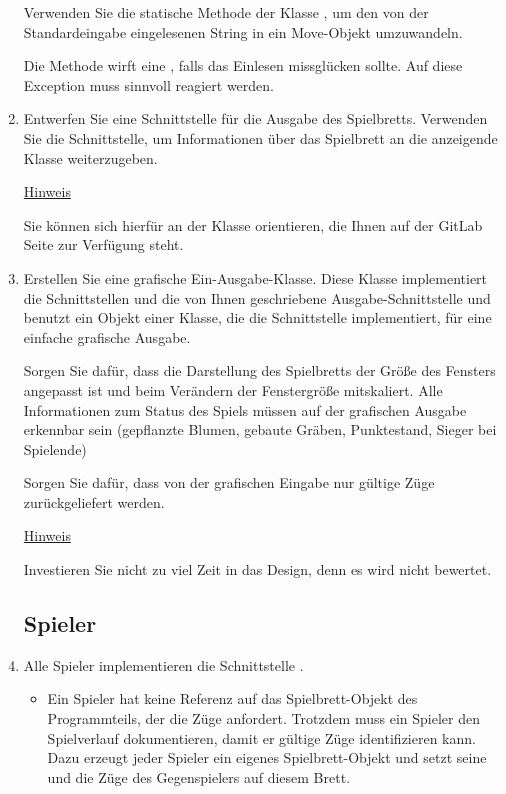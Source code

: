 \begin{enumerate}
Verwenden Sie die statische Methode  der Klasse , um den von der Standardeingabe eingelesenen String in ein Move-Objekt umzuwandeln.

Die Methode  wirft eine , falls das Einlesen missglücken sollte. Auf diese Exception muss sinnvoll reagiert werden.

\item Entwerfen Sie eine Schnittstelle für die Ausgabe des Spielbretts. Verwenden Sie die  Schnittstelle, um Informationen über das Spielbrett an die anzeigende Klasse weiterzugeben.

\underline{Hinweis}

Sie können sich hierfür an der Klasse  orientieren, die Ihnen auf der GitLab Seite zur Verfügung steht.

\item Erstellen Sie eine grafische Ein-Ausgabe-Klasse. Diese Klasse implementiert die Schnittstellen  und die von Ihnen geschriebene Ausgabe-Schnittstelle und benutzt ein Objekt einer Klasse, die die Schnittstelle  implementiert, für eine einfache grafische Ausgabe.

Sorgen Sie dafür, dass die Darstellung des Spielbretts der Größe des Fensters angepasst ist und beim Verändern der Fenstergröße mitskaliert. Alle Informationen zum Status des Spiels müssen auf der grafischen Ausgabe erkennbar sein (gepflanzte Blumen, gebaute Gräben, Punktestand, Sieger bei Spielende)

Sorgen Sie dafür, dass von der grafischen Eingabe nur gültige Züge zurückgeliefert werden.

\underline{Hinweis}

Investieren Sie nicht zu viel Zeit in das Design, denn es wird nicht bewertet.
\newpage

\subsection*{Spieler}

\item Alle Spieler implementieren die Schnittstelle .

\begin{itemize}
\item Ein Spieler hat keine Referenz auf das Spielbrett-Objekt des Programmteils, der die Züge anfordert. Trotzdem muss ein Spieler den Spielverlauf dokumentieren, damit er gültige Züge identifizieren kann. Dazu erzeugt jeder Spieler ein eigenes Spielbrett-Objekt und setzt seine und die Züge des Gegenspielers auf diesem Brett.


\end{itemize}
\end{enumerate}
